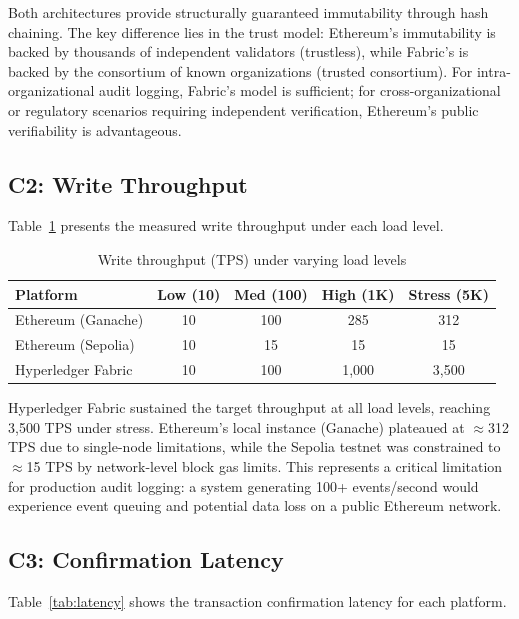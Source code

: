 \documentclass[12pt,a4paper]{article}
\begin{document}
Both architectures provide structurally guaranteed immutability through hash chaining. The key difference lies in the trust model: Ethereum's immutability is backed by thousands of independent validators (trustless), while Fabric's is backed by the consortium of known organizations (trusted consortium). For intra-organizational audit logging, Fabric's model is sufficient; for cross-organizational or regulatory scenarios requiring independent verification, Ethereum's public verifiability is advantageous.

\subsection{C2: Write Throughput}

Table~\ref{tab:throughput} presents the measured write throughput under each load level.

\begin{table}[H]
\centering
\caption{Write throughput (TPS) under varying load levels}
\label{tab:throughput}
\begin{tabular}{@{}lcccc@{}}
\toprule
\textbf{Platform} & \textbf{Low (10)} & \textbf{Med (100)} & \textbf{High (1K)} & \textbf{Stress (5K)} \\
\midrule
Ethereum (Ganache)    & 10   & 100  & 285    & 312 \\
Ethereum (Sepolia)    & 10   & 15   & 15     & 15 \\
Hyperledger Fabric    & 10   & 100  & 1,000  & 3,500 \\
\bottomrule
\end{tabular}
\end{table}

Hyperledger Fabric sustained the target throughput at all load levels, reaching 3,500 TPS under stress. Ethereum's local instance (Ganache) plateaued at $\approx$312 TPS due to single-node limitations, while the Sepolia testnet was constrained to $\approx$15 TPS by network-level block gas limits. This represents a critical limitation for production audit logging: a system generating 100+ events/second would experience event queuing and potential data loss on a public Ethereum network.

\subsection{C3: Confirmation Latency}

Table~\ref{tab:latency} shows the transaction confirmation latency for each platform.
\end{document}
